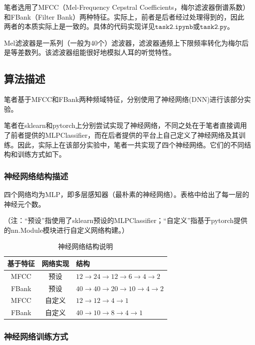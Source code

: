 \documentclass[a4paper]{article}
\begin{document}
笔者选用了MFCC（Mel-Frequency Cepstral Coefficients，梅尔滤波器倒谱系数）和FBank（Filter Bank）两种特征。实际上，前者是后者经过处理得到的，因此两者的本质实际上是一致的。具体的代码实现详见$\mathtt{task2.ipynb}$或$\mathtt{task2.py}$。

Mel滤波器是一系列（一般为40个）滤波器，滤波器通频上下限频率转化为梅尔后是等差数列。该滤波器组能很好地模拟人耳的听觉特性。

\subsection{算法描述}

    笔者基于MFCC和FBank两种频域特征，分别使用了神经网络(DNN)进行该部分实验。
    
    笔者在sklearn和pytorch上分别尝试实现了神经网络，不同之处在于笔者直接调用了前者提供的MLPClassifier，而在后者提供的平台上自己定义了神经网络及其训练。因此，实际上在该部分实验中，笔者一共实现了四个神经网络。它们的不同结构和训练方式如下。
    
    \subsubsection{神经网络结构描述}
    四个网络均为MLP，即多层感知器（最朴素的神经网络）。表格中给出了每一层的神经元个数。
    
    （注：“预设”指使用了sklearn预设的MLPClassifier；“自定义”指基于pytorch提供的nn.Module模块进行自定义网络构建。）
\begin{table}[th]
  \centering
  \begin{tabular}{ c c l}
    \toprule
    \textbf{基于特征} & \textbf{网络实现} & \textbf{结构} \\
    \midrule
    MFCC & 预设 & $12\to24\to12\to6\to4\to2$ \\
    FBank & 预设 & $40\to40\to20\to10\to4\to2$ \\
    MFCC & 自定义 & $12\to12\to4\to1$ \\
    FBank & 自定义 & $40\to10\to8\to4\to1$ \\
    \bottomrule
  \end{tabular}
  \vspace{0.5em}
  \centering \caption{神经网络结构说明}
  \label{tab3}
\end{table}
    
\subsubsection{神经网络训练方式}
    
\end{document}

